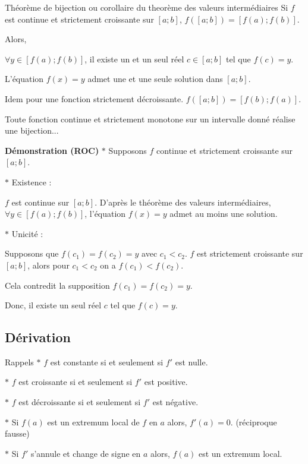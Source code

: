 \medskip

\begin{bclogo}{Théorème de bijection ou corollaire du theorème des valeurs intermédiaires}
Si $f$ est continue et strictement croissante sur $\left[ a;b\right]$, $f(\left[ a;b\right])=\left[ f(a);f(b)\right]$.

Alors,
\begin{center} $\forall y\in \left[ f(a);f(b)\right]$, il existe un et un seul réel $c\in \left[ a;b\right]$ tel que $f(c)=y$.
\end{center}

L'équation $f(x)=y$ admet une et une seule solution dans $\left[ a;b\right]$. 

Idem pour une fonction strictement décroissante.     $f(\left[ a;b\right])=\left[ f(b);f(a)\right]$.

Toute fonction continue et strictement monotone sur un intervalle donné réalise une bijection... 
\end{bclogo}


\medskip

\begin{bclogo}{\textbf{Démonstration (ROC)}}
$\ast$ Supposons $f$ continue et strictement croissante sur $\left[a;b\right]$.

$\ast$ Existence :

$f$ est continue sur $\left[a;b\right]$. D'après le théorème des valeurs intermédiaires, $\forall y \in \left[ f(a);f(b)\right]$, l'équation $f(x)=y$ admet au moins une solution.  

$\ast$ Unicité :

Supposons que $f(c_1)=f(c_2)=y$ avec $c_1<c_2$. $f$ est strictement croissante sur $\left[ a;b\right]$, alors pour $c_1<c_2$ on a $f(c_1)<f(c_2)$. 

Cela contredit la supposition $f(c_1)=f(c_2)=y$.

Donc, il existe un seul réel $c$ tel que $f(c)=y$.
\end{bclogo} 

\medskip

\subsection{Dérivation}

\begin{bclogo}{Rappels}
$\ast$ $f$ est constante si et seulement si $f'$ est nulle.

$\ast$ $f$ est croissante si et seulement si $f'$ est positive.

$\ast$ $f$ est décroissante si et seulement si $f'$ est négative.

$\ast$ Si $f(a)$ est un extremum local de $f$ en $a$ alors, $f'(a)=0$. (réciproque fausse)

$\ast$ Si $f'$ s'annule et change de signe en $a$ alors, $f(a)$ est un extremum local.
\end{bclogo}


